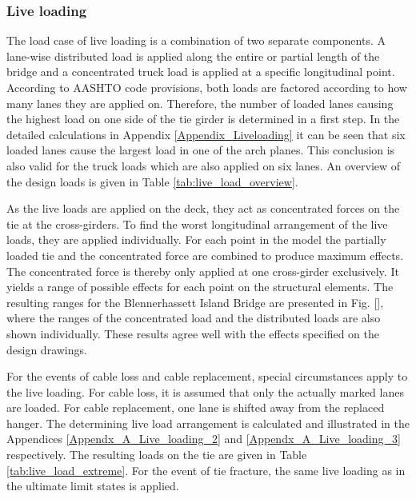 \subsubsection{Live loading} \label{sec:met_loads_live}
The load case of live loading is a combination of two separate components. A lane-wise distributed load is applied along the entire or partial length of the bridge and a concentrated truck load is applied at a specific longitudinal point. According to AASHTO code provisions, both loads are factored according to how many lanes they are applied on. Therefore, the number of loaded lanes causing the highest load on one side of the tie girder is determined in a first step. In the detailed calculations in Appendix \ref{Appendix_Liveloading} it can be seen that six loaded lanes cause the largest load in one of the arch planes. This conclusion is also valid for the truck loads which are also applied on six lanes. An overview of the design loads is given in Table \ref{tab:live_load_overview}. 



As the live loads are applied on the deck, they act as concentrated forces on the tie at the cross-girders. To find the worst longitudinal arrangement of the live loads, they are applied individually. For each point in the model the partially loaded tie and the concentrated force are combined to produce maximum effects. The concentrated force is thereby only applied at one cross-girder exclusively. It yields a range of possible effects for each point on the structural elements. The resulting ranges for the Blennerhassett Island Bridge are presented in Fig. [], where the ranges of the concentrated load and the distributed loads are also shown individually. These results agree well with the effects specified on the design drawings.\bigskip

For the events of cable loss and cable replacement, special circumstances apply to the live loading. For cable loss, it is assumed that only the actually marked lanes are loaded. For cable replacement, one lane is shifted away from the replaced hanger. The determining live load arrangement is calculated and illustrated in the Appendices \ref{Appendx_A_Live_loading_2} and \ref{Appendx_A_Live_loading_3} respectively. The resulting loads on the tie are given in Table \ref{tab:live_load_extreme}. For the event of tie fracture, the same live loading as in the ultimate limit states is applied.




